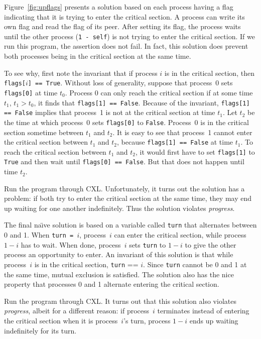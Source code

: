 \documentclass{report}
\begin{document}
Figure~\ref{fig:upflags} presents a solution based on each process having
a flag indicating that it is trying to enter the critical section.
A process can write its own flag and read the flag of its peer.
After setting its flag, the process waits until the other process
(\texttt{1 - self}) is not trying to enter the critical section.
If we run this program, the assertion does not fail.  In fact, this
solution does prevent both processes being in the critical section at
the same time.

To see why, first note the invariant that if process $i$ is in the
critical section, then \texttt{flags[$i$] == True}.
Without loss of generality,
suppose that process~0 sets \texttt{flags[0]} at time $t_0$.
Process 0 can only reach the critical section if at some time $t_1$,
$t_1 > t_0$, it finds that \texttt{flags[1] == False}.
Because of the invariant, \texttt{flags[1] == False} implies that
process~1 is not at the critical section at time $t_1$.
Let $t_2$ be the time at which process~0 sets \texttt{flags[0]}
to \texttt{False}.  Process~0 is in the critical section sometime
between $t_1$ and $t_2$.
It is easy to see that process~1 cannot enter the critical section
between $t_1$ and $t_2$, because \texttt{flags[1] == False} at
time $t_1$.  To reach the critical section between $t_1$ and $t_2$,
it would first have to set \texttt{flags[1]} to \texttt{True} and
then wait until \texttt{flags[0] == False}.  But that does not happen
until time $t_2$.

Run the program through CXL.  Unfortunately, it turns out the solution has a
problem: if both try to enter the critical section at the same time, they may
end up waiting for one another indefinitely.  Thus the solution
violates \emph{progress}.

The final na\"{\i}ve solution is based on a variable called \texttt{turn}
that alternates between 0 and 1.  When \texttt{turn = $i$}, process~$i$ can
enter the critical section, while process $1-i$ has to wait.  When done,
process~$i$ sets \texttt{turn} to $1-i$ to give the other process an
opportunity to enter.
An invariant of this solution is that while process~$i$ is in the critical
section, \texttt{turn} == $i$.
Since \texttt{turn} cannot be 0 and 1 at
the same time, mutual exclusion is satisfied.
The solution also has the nice property that
processes 0 and 1 alternate entering the critical section.

Run the program through CXL.  It turns out that this solution also violates
\emph{progress}, albeit for a different reason:
if process~$i$ terminates instead of entering the critical section when it
is process~$i$'s turn, process $1-i$ ends up waiting indefinitely for its
turn.
\end{document}
